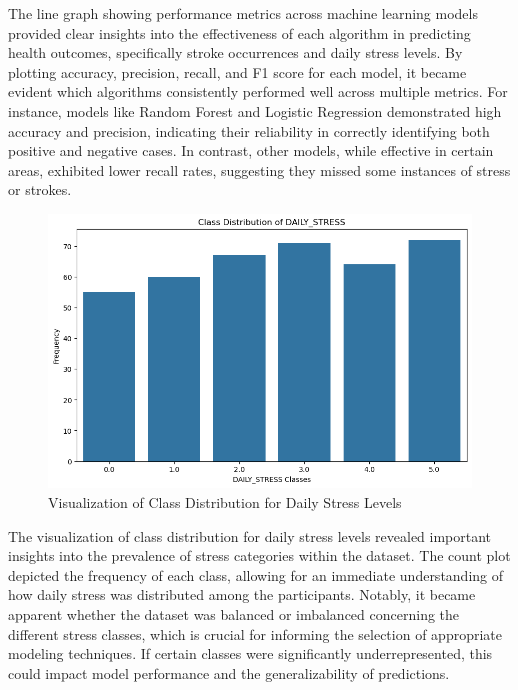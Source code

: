 \documentclass[runningheads]{llncs}
\begin{document}
\begin{enumerate}
The line graph showing performance metrics across machine learning models provided clear insights into the effectiveness of each algorithm in predicting health outcomes, specifically stroke occurrences and daily stress levels. By plotting accuracy, precision, recall, and F1 score for each model, it became evident which algorithms consistently performed well across multiple metrics. For instance, models like Random Forest and Logistic Regression demonstrated high accuracy and precision, indicating their reliability in correctly identifying both positive and negative cases. In contrast, other models, while effective in certain areas, exhibited lower recall rates, suggesting they missed some instances of stress or strokes. 

\newpage
\begin{figure}
    \centering
    \includegraphics[width=1.0\linewidth]{modeling 5.png}
    \caption{Visualization of Class Distribution for Daily Stress Levels} 
    \label{fig:enter-label}
\end{figure}

The visualization of class distribution for daily stress levels revealed important insights into the prevalence of stress categories within the dataset. The count plot depicted the frequency of each class, allowing for an immediate understanding of how daily stress was distributed among the participants. Notably, it became apparent whether the dataset was balanced or imbalanced concerning the different stress classes, which is crucial for informing the selection of appropriate modeling techniques. If certain classes were significantly underrepresented, this could impact model performance and the generalizability of predictions.


\end{enumerate}
\end{document}
